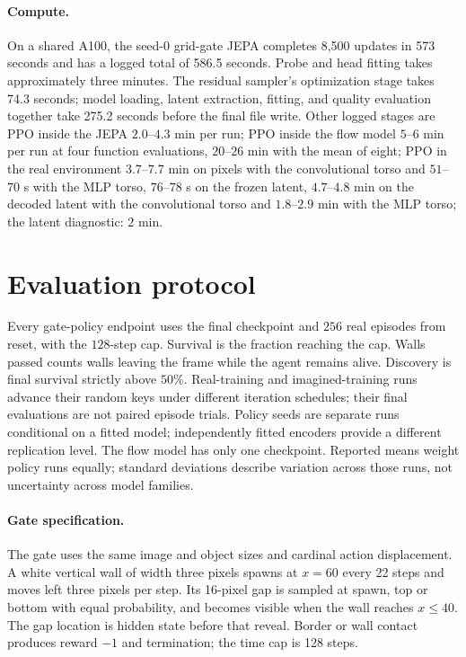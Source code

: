 \paragraph{Compute.} On a shared A100, the seed-0 grid-gate JEPA completes 8,500 updates in
573 seconds and has a logged total of 586.5 seconds. Probe and head fitting takes approximately
three minutes. The residual sampler's optimization stage takes 74.3 seconds; model loading, latent
extraction, fitting, and quality evaluation together take 275.2 seconds before the final file write.
Other logged stages are PPO inside the JEPA $2.0$--$4.3$ min per run; PPO inside the flow model
$5$--$6$ min per run at four function evaluations, $20$--$26$ min with the mean of eight; PPO in the real environment $3.7$--$7.7$ min on pixels with the convolutional torso and $51$--$70$ s with the MLP torso, $76$--$78$ s on the frozen latent, $4.7$--$4.8$ min on the decoded latent with the convolutional torso and $1.8$--$2.9$ min with the MLP torso; the latent diagnostic: $2$ min.

\section{Evaluation protocol}
\label{app:protocol}

Every gate-policy endpoint uses the final checkpoint and $256$ real episodes from reset, with the
$128$-step cap. Survival is the fraction reaching the cap. Walls passed counts walls leaving the
frame while the agent remains alive. Discovery is final survival strictly above $50\%$.
Real-training and imagined-training runs advance their random keys under different iteration schedules; their final evaluations are not paired episode trials. Policy seeds are separate
runs conditional on a fitted model; independently fitted encoders provide a different replication
level. The flow model has only one checkpoint. Reported means weight policy runs equally;
standard deviations describe variation across those runs, not uncertainty across model families.

\paragraph{Gate specification.}
The gate uses the same image and object sizes and cardinal action displacement. A white vertical
wall of width three pixels spawns at $x=60$ every 22 steps and moves left three pixels per step.
Its 16-pixel gap is sampled at spawn, top or bottom with equal probability, and becomes visible
when the wall reaches $x\le40$. The gap location is hidden state before that reveal. Border or wall
contact produces reward $-1$ and termination; the time cap is 128 steps.

